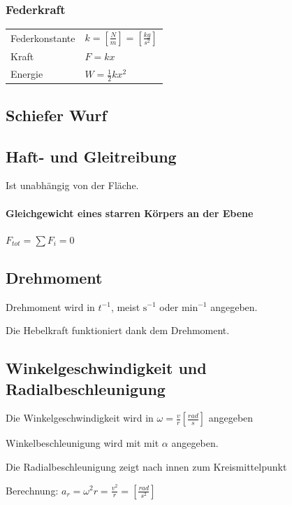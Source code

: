 \documentclass[a4paper]{scrartcl}
\begin{document}
\subsubsection{Federkraft}

	
	\begin{tabu} {l X}
		Federkonstante & $k = \left[ \frac{N}{m} \right] = \left[ \frac{kg}{s^2} \right]$ \\
		Kraft & $F = kx$ \\ %
		Energie & $	W = \frac{1}{2} k x^2$
	\end{tabu}
	

\subsection{Schiefer Wurf}

\subsection{Haft- und Gleitreibung}
	Ist unabhängig von der Fläche.
	
	
	
	\paragraph{Gleichgewicht eines starren Körpers an der Ebene}
	$F_{tot} = \sum{F_i} = 0$


\subsection{Drehmoment}
	Drehmoment wird in $t^{-1}$, meist $\text{s}^{-1}$ oder $\text{min}^{-1}$ angegeben.
	
	Die Hebelkraft funktioniert dank dem Drehmoment.

\subsection{Winkelgeschwindigkeit und Radialbeschleunigung}
	Die Winkelgeschwindigkeit wird in $\omega = \frac{v}{r}\left[ \frac{rad}{s} \right]$ angegeben
	
	Winkelbeschleunigung wird mit mit $\alpha$ angegeben.
	
	Die Radialbeschleunigung zeigt nach innen zum Kreismittelpunkt
	
	Berechnung: $a_r = \omega^2 r = \frac{v^2}{r} = \left[ \frac{rad}{s^2} \right]$
\end{document}
